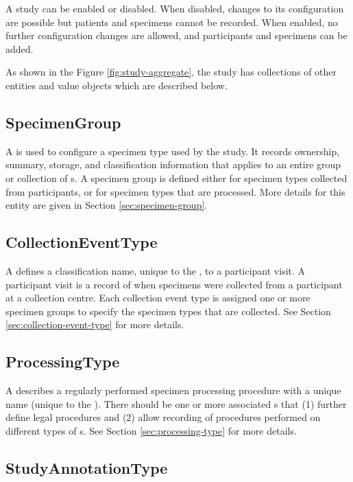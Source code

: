 A study can be enabled or disabled. When disabled, changes to its configuration
are possible but patients and specimens cannot be recorded. When enabled, no
further configuration changes are allowed, and participants and specimens can
be added.

As shown in the Figure \ref{fig:study-aggregate}, the study has collections of
other entities and value objects which are described below.

\subsection*{SpecimenGroup}

A  is used to configure a specimen type used by the
study.  It records ownership, summary, storage, and classification information
that applies to an entire group or collection of s. A
specimen group is defined either for specimen types collected from
participants, or for specimen types that are processed. More details for this
entity are given in Section \ref{sec:specimen-group}.

\subsection*{CollectionEventType}
A  defines a classification name, unique to
the , to a participant visit. A participant visit is a record
of when specimens were collected from a participant at a collection
centre. Each collection event type is assigned one or more specimen groups to
specify the specimen types that are collected. See Section
\ref{sec:collection-event-type} for more details.

\subsection*{ProcessingType}
A  describes a regularly performed specimen
processing procedure with a unique name (unique to the
). There should be one or more associated
s that (1) further define legal procedures and (2)
allow recording of procedures performed on different types of
s. See Section \ref{sec:processing-type} for more details.

\subsection*{StudyAnnotationType}

